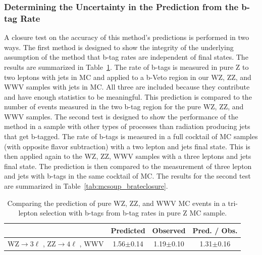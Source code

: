         		\subsubsection{Determining the Uncertainty in the Prediction from the b-tag Rate}
		A closure test on the accuracy of this method's predictions is performed in two ways. The first method is designed to show the integrity of the underlying assumption of the method that b-tag rates are independent of final states. The results are summarized in Table~\ref{tab:wz_z_brateclosure}. The rate of b-tags is measured in pure Z to two leptons with jets in MC and applied to a b-Veto region in our WZ, ZZ, and WWV samples with jets in MC. All three are included because they contribute and have enough statistics to be meaningful. This prediction is compared to the number of events measured in the two b-tag region for the pure WZ, ZZ, and WWV samples. The second test is designed to show the performance of the method in a sample with other types of processes than radiation producing jets that get b-tagged. The rate of b-tags is measured in a full cocktail of MC samples (with opposite flavor subtraction) with a two lepton and jets final state. This is then applied again to the WZ, ZZ, WWV samples with a three leptons and jets final state. The prediction is then compared to the measurement of three lepton and jets with b-tags in the same cocktail of MC. The results for the second test are summarized in Table~\ref{tab:mcsoup_brateclosure}.\\

\begin{table}[ht!]
\begin{center}

\begin{tabular}{c|ccc}\hline
                                                                                               & Predicted            & Observed          & Pred. / Obs.\\
\hline \hline
WZ$\rightarrow 3\ell $ , ZZ$\rightarrow 4\ell$ , WWV  &  1.56$\pm$0.14 & 1.19$\pm$0.10 & 1.31$\pm$0.16\\		
\hline
\end{tabular}
\caption{ \label{tab:wz_z_brateclosure} Comparing the prediction of pure WZ, ZZ, and WWV MC events in a tri-lepton selection with b-tags from b-tag rates in pure Z MC sample.}
\end{center}
\end{table}

